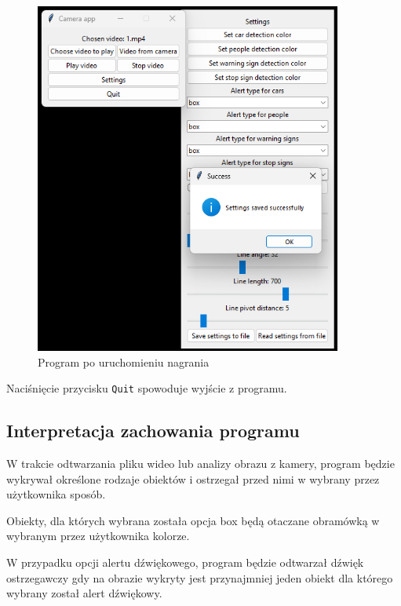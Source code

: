 \begin{figure}[H]
	\centering
	\includegraphics[width=0.9\textwidth]{Img/manual/settings_saved.png}
	\caption{Program po uruchomieniu nagrania}
	\label{fig:settings_saved}
\end{figure}

Naciśnięcie przycisku \verb|Quit| spowoduje wyjście z programu.

\subsection{Interpretacja zachowania programu}

W trakcie odtwarzania pliku wideo lub analizy obrazu z kamery, program będzie wykrywał określone rodzaje obiektów i ostrzegał przed nimi w wybrany przez użytkownika sposób.

Obiekty, dla których wybrana została opcja box będą otaczane obramówką w wybranym przez użytkownika kolorze.

W przypadku opcji alertu dźwiękowego, program będzie odtwarzał dźwięk ostrzegawczy gdy na obrazie wykryty jest przynajmniej jeden obiekt dla którego wybrany został alert dźwiękowy.




